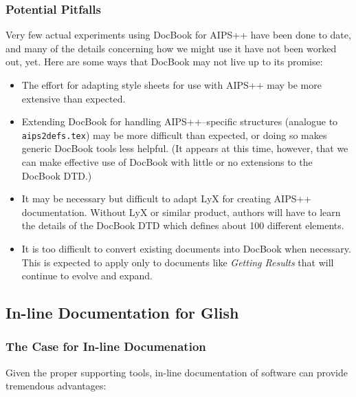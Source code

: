\subsubsection{Potential Pitfalls}

Very few actual experiments using DocBook for AIPS++ have been done to
date, and many of the details concerning how we might use it have not
been worked out, yet.  Here are some ways that DocBook may not live up
to its promise: 

\begin{itemize}
\item The effort for adapting style sheets for use with AIPS++ may be
more extensive than expected.

\item Extending DocBook for handling AIPS++--specific structures
(analogue to {\tt aips2defs.tex}) may be more difficult than
expected, or doing so makes generic DocBook tools less helpful.  (It
appears at this time, however, that we can make effective use of
DocBook with little or no extensions to the DocBook DTD.)  

\item It may be necessary but difficult to adapt LyX for creating
AIPS++ documentation.  Without LyX or similar product, authors will
have to learn the details of the DocBook DTD which defines about 100
different elements.

\item It is too difficult to convert existing documents into DocBook
when necessary.  This is expected to apply only to documents like {\it
Getting Results} that will continue to evolve and expand.

\end{itemize}

\subsection{In-line Documentation for Glish}

\subsubsection{The Case for In-line Documenation}

Given the proper supporting tools, in-line documentation of software
can provide tremendous advantages:

